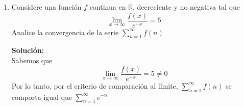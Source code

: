 \documentclass[12pt]{article}
\newenvironment{solucion}
{\begin{mdframed}[backgroundcolor=black!10]
		{\bf Solución:}\\
	}
	{
	\end{mdframed}
}
\newenvironment{preguntas}
{\begin{enumerate}\itemsep12pt
	}
	{
	\end{enumerate}
}
\newcommand{\ev}{\Big|}
\newcommand{\ra}{\rightarrow}
\newcommand{\R}{\mathbb{R}}
\begin{document}
\begin{preguntas}
\begin{solucion}
\begin{enumerate}[a)]
$$			=\lim\limits_{n \ra \infty} \dfrac{\dfrac{1}{nln(n)}}{\dfrac{1}{nln(n)}} = 1 \neq 0$$
			Por lo tanto, $\sum\limits^{\infty} a_n$ se comporta igual que $\sum\limits^{\infty} b_n$.\\
			\\
			Veamos ahora que pasa con $\sum\limits_{n=2}^{\infty} \dfrac{1}{nln(n)}$. Usando el criterio de la integral, tenemos que la serie se comportara igual a $\displaystyle\int_2^{\infty} \dfrac{1}{xln(x)}$. \\
			\\
			Calculemos entonces esta integral impropia,
			$$\displaystyle\int_2^{\infty} \dfrac{1}{xln(x)} =  ln(ln(x)) \ev_2^{\infty} = \infty$$
			Luego, $\displaystyle\int_2^{\infty} \dfrac{1}{xln(x)}$ diverge, por lo que por criterio de la integral, $\sum\limits_{n=2}^{\infty} \dfrac{1}{nln(n)}$ tambiém diverge. Finalmente, por el criterio de comparación al limite, la serie $\sum\limits_{n=2}^{\infty}\dfrac{n}{(n+1)^2ln(n)}$ es divergente.
\item $\sum\limits_{n=1}^{\infty}\dfrac{n!}{n^n}$\\
			\\
			Recordemos que en el infinito,
			$$n^n > n! > a^n > n > ln(n)$$
			El límite de la sucesión es
			$$\lim\limits_{n\ra\infty}\dfrac{n!}{n^n} = 0$$
			Usando el criterio de la razón,
			$$\lim\limits_{n \ra \infty} \dfrac{a_{n+1}}{a_n}
			= \lim\limits_{n \ra \infty} \dfrac{\dfrac{(n+1)!}{(n+1)^{n+1}}}{\dfrac{n!}{n^n}}
			= \lim\limits_{n \ra \infty} \dfrac{(n+1)!}{n!}\dfrac{n^n}{(n+1)^{n+1}}$$
			$$= \lim\limits_{n \ra \infty} \dfrac{(n+1)}{1}\dfrac{n^n}{(n+1)^{n+1}}
			= \lim\limits_{n \ra \infty} \dfrac{n^n}{(n+1)^{n}}
			= \lim\limits_{n \ra \infty} \left(\dfrac{n}{n+1}\right)^n$$
			$$= \lim\limits_{n \ra \infty} \dfrac{1}{\left(\dfrac{n+1}{n}\right)^n}
			= \dfrac{1}{e} < 1$$
			Por criterio de la razón, la serie es convergente.
\end{enumerate}
\end{solucion}
\item Considere una función $f$ continua en $\R$, decreciente y no negativa tal que
	$$\lim_{x\ra\infty}\dfrac{f(x)}{e^{-x}}=5$$
	Analice la convergencia de la serie $\sum\limits_{n=1}^{\infty}f(n)$
\begin{solucion}
Sabemos que
		$$\lim_{x\ra\infty}\dfrac{f(x)}{e^{-x}}=5 \neq 0$$
		Por lo tanto, por el criterio de comparación al límite, $\sum\limits_{n=1}^{\infty}f(n)$ se comporta igual que $\sum\limits_{n=1}^{\infty}e^{-n}$\\
		\\

\end{solucion}
\end{preguntas}
\end{document}
